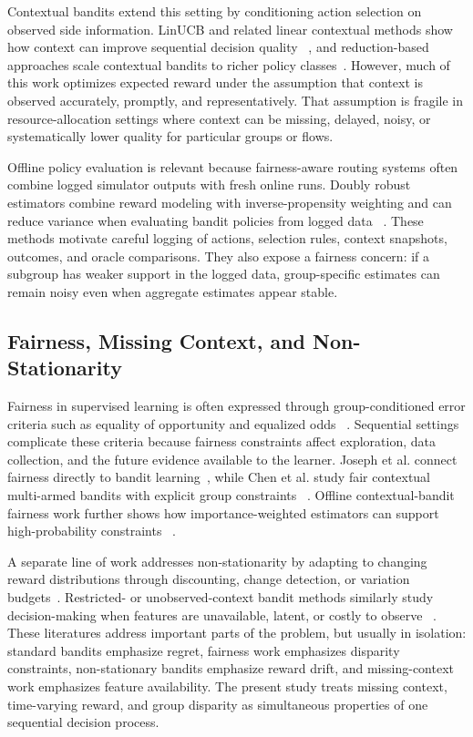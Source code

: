 \documentclass[conference]{IEEEtran}
\begin{document}
Contextual bandits extend this setting by conditioning action selection on
observed side information. LinUCB and related linear contextual methods show
how context can improve sequential decision quality
~\cite{li2010contextual,abbasi2011linear}, and reduction-based approaches
scale contextual bandits to richer policy classes~\cite{agarwal2014taming}.
However, much of this work optimizes expected reward under the assumption that
context is observed accurately, promptly, and representatively. That assumption
is fragile in resource-allocation settings where context can be missing,
delayed, noisy, or systematically lower quality for particular groups or
flows.

Offline policy evaluation is relevant because fairness-aware routing systems
often combine logged simulator outputs with fresh online runs. Doubly robust
estimators combine reward modeling with inverse-propensity weighting and can
reduce variance when evaluating bandit policies from logged data
~\cite{dudik2011doubly}. These methods motivate careful logging of actions,
selection rules, context snapshots, outcomes, and oracle comparisons. They
also expose a fairness concern: if a subgroup has weaker support in the logged
data, group-specific estimates can remain noisy even when aggregate estimates
appear stable.

\subsection{Fairness, Missing Context, and Non-Stationarity}
Fairness in supervised learning is often expressed through group-conditioned
error criteria such as equality of opportunity and equalized odds
~\cite{hardt2016equality}. Sequential settings complicate these criteria
because fairness constraints affect exploration, data collection, and the
future evidence available to the learner. Joseph et al. connect fairness
directly to bandit learning~\cite{joseph2016fairness}, while Chen et al. study
fair contextual multi-armed bandits with explicit group constraints
~\cite{chen2020fair}. Offline contextual-bandit fairness work further shows
how importance-weighted estimators can support high-probability constraints
~\cite{metevier2019offline}.

A separate line of work addresses non-stationarity by adapting to changing
reward distributions through discounting, change detection, or variation
budgets~\cite{garivier2008ucb,besbes2014stochastic}. Restricted- or
unobserved-context bandit methods similarly study decision-making when
features are unavailable, latent, or costly to observe
~\cite{bouneffouf2017context,park2022efficient}. These literatures address
important parts of the problem, but usually in isolation: standard bandits
emphasize regret, fairness work emphasizes disparity constraints,
non-stationary bandits emphasize reward drift, and missing-context work
emphasizes feature availability. The present study treats missing context,
time-varying reward, and group disparity as simultaneous properties of one
sequential decision process.
\end{document}
